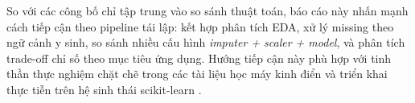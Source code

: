 So với các công bố chỉ tập trung vào so sánh thuật toán, báo cáo này nhấn mạnh cách tiếp cận theo pipeline tái lập:
kết hợp phân tích EDA, xử lý missing theo ngữ cảnh y sinh, so sánh nhiều cấu hình \textit{imputer + scaler + model}, và phân tích trade-off
chỉ số theo mục tiêu ứng dụng. Hướng tiếp cận này phù hợp với tinh thần thực nghiệm chặt chẽ trong các tài liệu học máy kinh điển
\cite{hastie2009elements} và triển khai thực tiễn trên hệ sinh thái scikit-learn \cite{pedregosa2011sklearn}.
